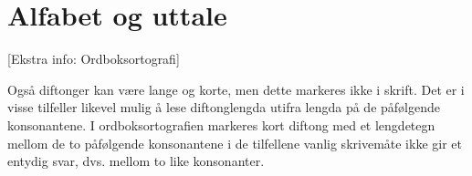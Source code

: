 \chapter{Alfabet og uttale}

[Ekstra info: Ordboksortografi]

Også diftonger kan være lange og korte, men dette markeres ikke i skrift. Det er i visse tilfeller likevel mulig å lese diftonglengda utifra lengda på de påfølgende konsonantene. I ordboksortografien markeres kort diftong med et lengdetegn mellom de to påfølgende konsonantene i de tilfellene vanlig skrivemåte ikke gir et entydig svar, dvs. mellom to like konsonanter.